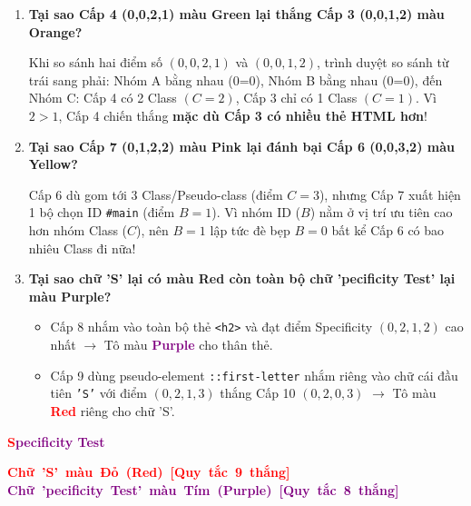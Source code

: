 \documentclass[11pt,oneside]{book}
\newcommand{\codeinline}[1]{\textcolor{accentOrange}{\texttt{#1}}}
\begin{document}
\begin{conceptBox}
\begin{enumerate}[leftmargin=1.5em, itemsep=4pt, parsep=0pt]
    \item \textbf{Tại sao Cấp 4 (0,0,2,1) màu Green lại thắng Cấp 3 (0,0,1,2) màu Orange?} \par
    Khi so sánh hai điểm số $(0,0,2,1)$ và $(0,0,1,2)$, trình duyệt so sánh từ trái sang phải: Nhóm A bằng nhau (0=0), Nhóm B bằng nhau (0=0), đến Nhóm C: Cấp 4 có 2 Class $(C=2)$, Cấp 3 chỉ có 1 Class $(C=1)$. Vì $2 > 1$, Cấp 4 chiến thắng \textbf{mặc dù Cấp 3 có nhiều thẻ HTML hơn}!
    
    \item \textbf{Tại sao Cấp 7 (0,1,2,2) màu Pink lại đánh bại Cấp 6 (0,0,3,2) màu Yellow?} \par
    Cấp 6 dù gom tới 3 Class/Pseudo-class (điểm $C=3$), nhưng Cấp 7 xuất hiện 1 bộ chọn ID \codeinline{\#main} (điểm $B=1$). Vì nhóm ID ($B$) nằm ở vị trí ưu tiên cao hơn nhóm Class ($C$), nên $B=1$ lập tức đè bẹp $B=0$ bất kể Cấp 6 có bao nhiêu Class đi nữa!
    
    \item \textbf{Tại sao chữ 'S' lại có màu Red còn toàn bộ chữ 'pecificity Test' lại màu Purple?} \par
    \begin{itemize}[leftmargin=1.2em, itemsep=2pt]
        \item Cấp 8 nhắm vào toàn bộ thẻ \codeinline{<h2>} và đạt điểm Specificity $(0,2,1,2)$ cao nhất $\rightarrow$ Tô màu \textbf{\textcolor{purple}{Purple}} cho thân thẻ.
        \item Cấp 9 dùng pseudo-element \codeinline{::first-letter} nhắm riêng vào chữ cái đầu tiên \codeinline{'S'} với điểm $(0,2,1,3)$ thắng Cấp 10 $(0,2,0,3)$ $\rightarrow$ Tô màu \textbf{\textcolor{red}{Red}} riêng cho chữ 'S'.
    \end{itemize}
\end{enumerate}
\end{conceptBox}

\begin{browserWindow}
\centering\vspace{8pt}
{\sffamily\Huge\bfseries \textcolor{red}{S}\textcolor{purple}{pecificity Test}}
\par\vspace{10pt}
\sffamily\small
\mbox{\textcolor{red}{\textbf{Chữ 'S' màu Đỏ (Red) [Quy tắc 9 thắng]}}} \qquad \mbox{\textcolor{purple}{\textbf{Chữ 'pecificity Test' màu Tím (Purple) [Quy tắc 8 thắng]}}}
\par\vspace{6pt}
\end{browserWindow}
\end{document}
